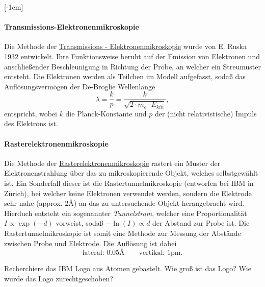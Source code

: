 \documentclass{subfiles}
\begin{document}
    [-1cm]
        \paragraph*{Transmissions-Elektronenmikroskopie}
            Die Methode der \href{https://de.wikipedia.org/wiki/Transmissionselektronenmikroskop}{Transmissions - Elektronenmikroskopie} wurde von E. Ruska 1932 entwickelt. Ihre Funktionsweise beruht auf der Emission von Elektronen und anschließender Beschleunigung in Richtung der Probe, an welcher ein Streumuster entsteht. Die Elektronen werden als Teilchen im Modell aufgefasst, sodaß das Auflösungsvermögen der De-Broglie Wellenlänge 
            \[\lambda = \frac{k}{p} = \frac{k}{\sqrt{2\cdot m_e\cdot E_\textit{kin}}},\]
            entspricht, wobei $k$ die Planck-Konstante und $p$ der (nicht relativistische) Impuls des Elektrons ist.

        \paragraph*{Rasterelektronenmikroskopie}
            Die Methode der \href{https://de.wikipedia.org/wiki/Rasterelektronenmikroskopie}{Rasterelektronenmikroskopie} rastert ein Muster der Elektronenstrahlung über das zu mikroskopierende Objekt, welches selbstgewählt ist. Ein Sonderfall dieser ist die Rastertunnelmikroskopie (entworfen bei IBM in Zürich), bei welcher keine Elektronen verwendet werden, sondern die Elektrode sehr nahe (approx. $2\si\angstrom$) an das zu untersuchende Objekt herangebracht wird. Hierduch entsteht ein sogenannter \emph{Tunnelstrom}, welcher eine Proportionalität $I\propto \exp(-d)$ vorweist, sodaß $-\ln(I)\propto d$ der Abstand zur Probe ist. Die Rastertunnelmikroskopie ist somit eine Methode zur Messung der Abstände zwischen Probe und Elektrode. Die Auflösung ist dabei 
            \[\text{lateral: }0.05\si\angstrom \qquad\text{vertikal: }1\si{\pico\metre}.\]
            \begin{Aufgabe}
                \nr{} Recherchiere das IBM Logo aus Atomen gebastelt. Wie groß ist das Logo? Wie wurde das Logo zurechtgeschoben?
            \end{Aufgabe}
        
    
\end{document}
